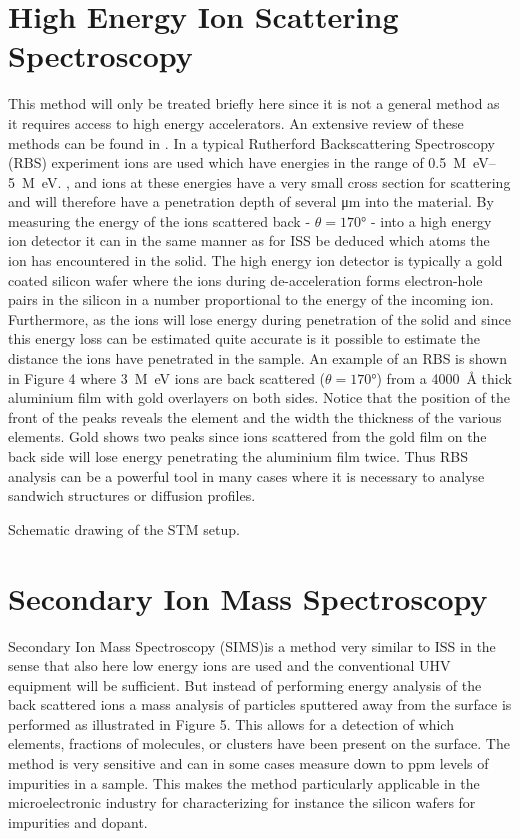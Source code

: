 \section{High Energy Ion Scattering Spectroscopy}
This method will only be treated briefly here since it is not a general method as it requires access to high energy accelerators. An extensive review of these methods can be found in \cite{feldman}. In a typical Rutherford Backscattering Spectroscopy (RBS) experiment ions are used which have energies in the range of \SIrange{0.5}{5}{M\electronvolt}. ,  and  ions at these energies have a very small cross section for scattering and will therefore have a penetration depth of several \si{\micro m} into the material. By measuring the energy of the ions scattered back - $\theta=\ang{170}$  - into a high energy ion detector it can in the same manner as for ISS be deduced which atoms the ion has encountered in the solid. The high energy ion detector is typically a gold coated silicon wafer where the ions during de-acceleration forms electron-hole pairs in the silicon in a number proportional to the energy of the incoming ion. Furthermore, as the ions will lose energy during penetration of the solid and since this energy loss can be estimated quite accurate is it possible to estimate the distance the ions have penetrated in the sample. An example of an RBS is shown in Figure 4 where \SI{3}{M\electronvolt}  ions are back scattered ($\theta=\ang{170}$) from a \SI{4000}{\angstrom} thick aluminium film with gold overlayers on both sides. Notice that the position of the front of the peaks reveals the element and the width the thickness of the various elements. Gold shows two peaks since ions scattered from the gold film on the back side will lose energy penetrating the aluminium film twice. Thus RBS analysis can be a powerful tool in many cases where it is necessary to analyse sandwich structures or diffusion profiles.

\vspace*{11cm}

 Schematic drawing of the STM setup.

\vspace{1cm}

\section{Secondary Ion Mass Spectroscopy} Secondary Ion Mass Spectroscopy (SIMS)is a method very similar to ISS in the sense that also here low energy ions are used and the conventional UHV equipment will be sufficient. But instead of performing energy analysis of the back scattered ions a mass analysis of particles sputtered away from the surface is performed as illustrated in Figure 5. This allows for a detection of which elements, fractions of molecules, or clusters have been present on the surface. The method is very sensitive and can in some cases measure down to ppm levels of impurities in a sample. This makes the method particularly applicable in the microelectronic industry for characterizing for instance the silicon wafers for impurities and dopant.

